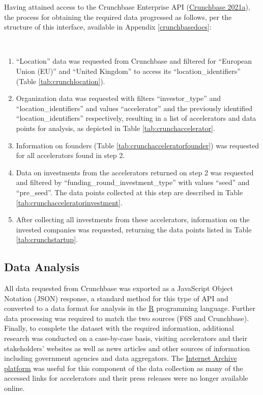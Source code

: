 \documentclass[
  12pt,
]{article}
\begin{document}
Having attained access to the Crunchbase Enterprise API (\protect\hyperlink{ref-crunchbase_documentation_2021}{Crunchbase 2021a}), the process for obtaining the required data progressed as follows, per the structure of this interface, available in Appendix \ref{crunchbasedocs}:

~

\begin{enumerate}
\def\labelenumi{\arabic{enumi}.}
\item
  ``Location'' data was requested from Crunchbase and filtered for ``European Union (EU)'' and ``United Kingdom'' to access its ``location\_identifiers'' (Table \ref{tab:crunchlocation}).
\item
  Organization data was requested with filters ``investor\_type'' and ``location\_identifiers'' and values ``accelerator'' and the previously identified ``location\_identifiers'' respectively, resulting in a list of accelerators and data points for analysis, as depicted in Table \ref{tab:crunchaccelerator}.
\item
  Information on founders (Table \ref{tab:crunchacceleratorfounder}) was requested for all accelerators found in step 2.
\item
  Data on investments from the accelerators returned on step 2 was requested and filtered by ``funding\_round\_investment\_type'' with values ``seed'' and ``pre\_seed''. The data points collected at this step are described in Table \ref{tab:crunchacceleratorinvestment}.
\item
  After collecting all investments from these accelerators, information on the invested companies was requested, returning the data points listed in Table \ref{tab:crunchstartup}.
\end{enumerate}

\hypertarget{data-analysis}{%
\subsection{Data Analysis}\label{data-analysis}}

All data requested from Crunchbase was exported as a JavaScript Object Notation (JSON) response, a standard method for this type of API and converted to a data format for analysis in the \href{https://www.r-project.org}{R} programming language. Further data processing was required to match the two sources (F6S and Crunchbase). Finally, to complete the dataset with the required information, additional research was conducted on a case-by-case basis, visiting accelerators and their stakeholders' websites as well as news articles and other sources of information including government agencies and data aggregators. The \href{https://web.archive.org}{Internet Archive platform} was useful for this component of the data collection as many of the accessed links for accelerators and their press releases were no longer available online.
\end{document}
